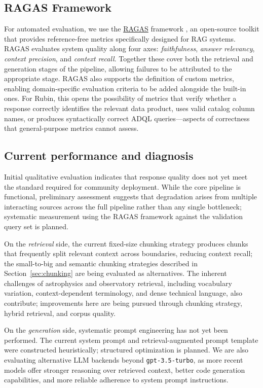 \subsection{RAGAS Framework}
\label{sec:ragas}
 
For automated evaluation, we use the \href{https://docs.ragas.io/}{RAGAS} framework \cite{Es2023}, an open-source toolkit that provides reference-free metrics specifically designed for RAG systems.
RAGAS evaluates system quality along four axes: \emph{faithfulness}, \emph{answer relevancy}, \emph{context precision}, and \emph{context recall}.
Together these cover both the retrieval and generation stages of the pipeline, allowing failures to be attributed to the appropriate stage.
 RAGAS also supports the definition of custom metrics, enabling domain-specific evaluation criteria to be added alongside the built-in ones.
For Rubin, this opens the possibility of metrics that verify whether a response correctly identifies the relevant data product, uses valid catalog column names, or produces syntactically correct \gls{ADQL} queries---aspects of correctness that general-purpose metrics cannot assess.
 
\subsection{Current performance and diagnosis}
\label{sec:performance}
 
Initial qualitative evaluation indicates that response quality does not yet meet the standard required for community deployment.
While the core pipeline is functional, preliminary assessment suggests that degradation arises from multiple interacting sources across the full pipeline rather than any single bottleneck; systematic measurement using the RAGAS framework against the validation query set is planned.
 
On the \emph{retrieval} side, the current fixed-size chunking strategy produces chunks that frequently split relevant context across boundaries, reducing context recall; the small-to-big and semantic chunking strategies described in Section~\ref{sec:chunking} are being evaluated as alternatives.
The inherent challenges of astrophysics and observatory retrieval, including vocabulary variation, context-dependent terminology, and dense technical language, also contribute; improvements here are being pursued through chunking strategy, hybrid retrieval, and corpus quality.
 
On the \emph{generation} side, systematic prompt engineering has not yet been performed.
The current system prompt and retrieval-augmented prompt template were constructed heuristically; structured optimization is planned.
We are also evaluating alternative LLM backends beyond \texttt{gpt-3.5-turbo}, as more recent models offer stronger reasoning over retrieved context, better code generation capabilities, and more reliable adherence to system prompt instructions.
 
